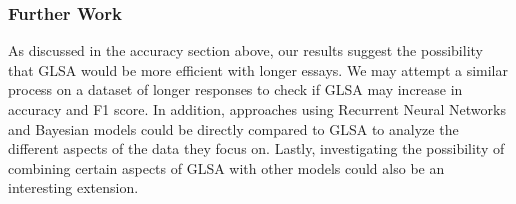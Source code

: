 \documentclass[10pt,letterpaper]{article}
\begin{document}
\subsubsection{Further Work}
As discussed in the accuracy section above, our results suggest the possibility that GLSA would be more efficient with longer essays. We may attempt a similar process on a dataset of longer responses to check if GLSA may increase in accuracy and F1 score. In addition, approaches using Recurrent Neural Networks and Bayesian models could be directly compared to GLSA to analyze the different aspects of the data they focus on. Lastly, investigating the possibility of combining certain aspects of GLSA with other models could also be an interesting extension.



\setlength{\bibleftmargin}{.125in}
\setlength{\bibindent}{-\bibleftmargin}


\end{document}
